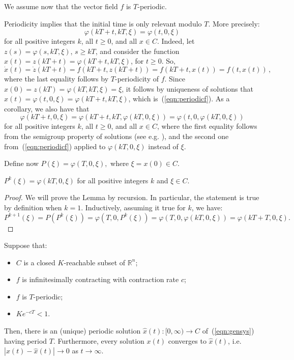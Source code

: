 \documentclass{svmult}
\newcommand{\opteqn}[1]{$#1$}
\newcommand{\mysubsection}[1]{\smallskip\noindent{\bf \emph{#1}.}}
\newcommand{\R}{{\mathbb R}}  %
\newcommand{\abs}[1]{\left\vert #1 \right\vert}
\newcommand{\be}[1]{\begin{equation}\label{#1}}
\newcommand{\ee}{\end{equation}}
\newcommand{\cc}{c}
\newcommand{\perorb}{\hat{x}}
\begin{document}
\mysubsection{Proof of Theorem \ref{theorem:contraction}}
We assume now that the vector field $f$ is $T$-periodic.

\begin{remark}\label{rem:periodicf}
Periodicity implies that the initial
time is only relevant modulo $T$.  More precisely:
\be{eqn:periodicf}
\varphi(kT+t,kT,\xi ) = \varphi(t,0,\xi )
\ee
for all positive integers $k$, all $t\geq 0$, and all $x\in C$.
Indeed, let $z(s)=\varphi(s,kT,\xi )$, $s\geq kT$, and consider the function
$x(t)=z(kT+t)=\varphi(kT+t,kT,\xi )$, for $t\geq 0$.
So,
\[
\dot x(t) = \dot z(kT+t) = f(kT+t,z(kT+t)) = f(kT+t,x(t)) = f(t,x(t))\,,
\]
where the last equality follows by $T$-periodicity of $f$.
Since $x(0)=z(kT)=\varphi(kT,kT,\xi )=\xi $, it follows by uniqueness of
solutions that $x(t)=\varphi(t,0,\xi ) = \varphi \left(kT+t,kT,\xi \right)$, which is~(\ref{eqn:periodicf}).
As a corollary, we also have that
\be{eqn:periodicfc}
\varphi(kT+t,0,\xi ) = \varphi(kT+t,kT,\varphi(kT,0,\xi )) = \varphi(t,0,\varphi(kT,0,\xi ))
\ee
for all positive integers $k$, all $t\geq 0$, and all $x\in C$,
where the first equality follows from the semigroup property of solutions (see e.g. \cite{mct}), and
the second one from~(\ref{eqn:periodicf}) applied to
$\varphi(kT,0,\xi )$ instead of $\xi $.
\end{remark}

Define now
\opteqn{
P(\xi ) = \varphi(T,0,\xi ),
}
where $\xi = x \left(0\right) \in C$. 

\begin{lemma}\label{lemma:P}
$P^k(\xi ) = \varphi(kT,0,\xi )$ for all positive integers $k$ and $\xi \in C$.
\end{lemma}

\begin{proof}
We will prove the Lemma by recursion. In particular, the statement is true by definition when $k=1$.
Inductively, assuming it true for $k$, we have:
\[
P^{k+1}(\xi ) = 
P(P^k(\xi )) =
\varphi(T,0,P^k(\xi )) = 
\varphi(T,0,\varphi(kT,0,\xi )) =
\varphi(kT+T,0,\xi ).
\]
\end{proof}

\begin{theorem}\label{theo:contraction-general}
Suppose that:
\begin{itemize}
\item $C$ is a closed $K$-reachable subset of $\R^n$;
\item $f$ is infinitesimally contracting with contraction rate $\cc$;
\item $f$ is $T$-periodic;
\item $Ke^{-\cc T}<1$.
\end{itemize}
Then, there is an (unique) periodic solution $\perorb(t):[0,\infty )\rightarrow C$
of~(\ref{eqn:gensys}) having period $T$. Furthermore, every solution $x(t)$
converges to $\perorb(t)$, i.e. $\abs{x(t)-\perorb(t)}\rightarrow 0$ as $t\rightarrow \infty $. 
\end{theorem}
\end{document}

